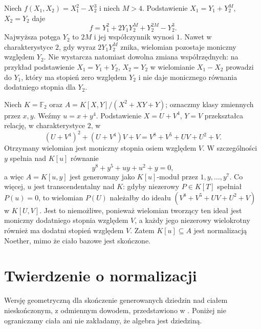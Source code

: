 \begin{przyklad}
Niech $f(X_1,X_2)=X_1^2-X_2^3$ i niech $M>4$.
Podstawienie $X_1=Y_1+Y_2^M$, $X_2=Y_2$ daje
\[
 f=Y_1^2+2Y_1Y_2^M+Y_2^{2M}-Y_2^3.
\]
Najwyższa potęga $Y_2$ to $2M$ i jej współczynnik wynosi $1$.
Nawet w charakterystyce $2$, gdy wyraz $2Y_1Y_2^M$
znika, wielomian pozostaje moniczny względem $Y_2$.
Nie wystarcza natomiast dowolna zmiana współrzędnych:
na przykład podstawienie $X_1=Y_1+Y_2$, $X_2=Y_2$
w wielomianie $X_1-X_2$ prowadzi do $Y_1$,
który ma stopień zero względem $Y_2$ i nie daje
monicznego równania dodatniego stopnia dla $Y_2$.
\end{przyklad}

\begin{przyklad}
\label{aa:prz:noether-f2}
Niech $K=\mathbb F_2$ oraz
$A=K[X,Y]/(X^2+XY+Y)$; oznaczmy klasy zmiennych przez
$x,y$. Weźmy $u=x+y^4$. Podstawienie $X=U+V^4$,
$Y=V$ przekształca relację, w charakterystyce $2$, w
\[
 (U+V^4)^2+(U+V^4)V+V
   =V^8+V^5+UV+U^2+V.
\]
Otrzymany wielomian jest moniczny stopnia osiem względem
$V$. W szczególności $y$ spełnia nad $K[u]$ równanie
\[
 y^8+y^5+uy+u^2+y=0,
\]
a więc $A=K[u,y]$ jest generowany jako $K[u]$-moduł
przez $1,y,\ldots,y^7$. Co więcej, $u$ jest
transcendentalny nad $K$: gdyby niezerowy $P\in K[T]$
spełniał $P(u)=0$, to wielomian $P(U)$ należałby
do ideału $(V^8+V^5+UV+U^2+V)$ w $K[U,V]$.
Jest to niemożliwe, ponieważ wielomian tworzący ten ideał
jest moniczny dodatniego stopnia względem $V$,
a każdy jego niezerowy wielokrotny również ma dodatni
stopień względem $V$. Zatem $K[u]\subseteq A$ jest
normalizacją Noether, mimo że ciało bazowe jest skończone.
\end{przyklad}

\section{Twierdzenie o normalizacji}
Wersję geometryczną dla skończenie generowanych dziedzin nad ciałem nieskończonym, z odmiennym dowodem, przedstawiono w . Poniżej nie ograniczamy ciała ani nie zakładamy, że algebra jest dziedziną.

